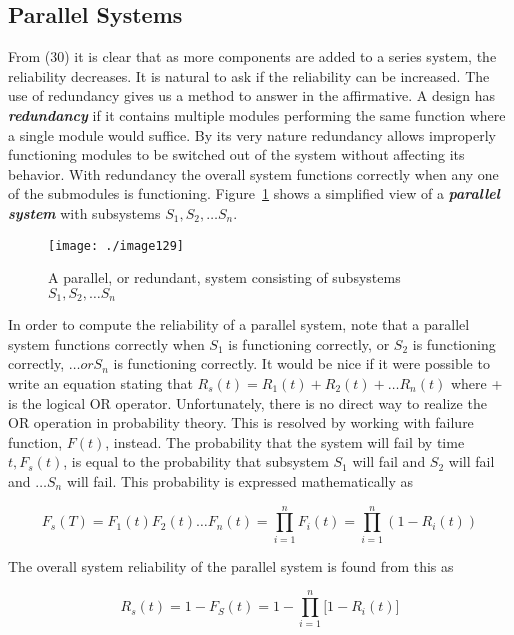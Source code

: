 {\subsection{Parallel Systems}
\label{subsection:parallel-systems}

From (30) it is clear that as more components are added to a series
system, the reliability decreases. It is natural to ask if the
reliability can be increased. The use of redundancy gives us a method to
answer in the affirmative. A design has \emph{\textbf{redundancy}} if it
contains multiple modules performing the same function where a single
module would suffice. By its very nature redundancy allows improperly
functioning modules to be switched out of the system without affecting
its behavior. With redundancy the overall system functions correctly
when any one of the submodules is functioning. 
Figure~\ref{figure:parallelSystem} shows a
simplified view of a \emph{\textbf{parallel system}} with subsystems
$S_1, S_2, \ldots S_n$.

\begin{figure}
\texttt{[image: ./image129]}
\caption{A parallel, or redundant, system consisting of
subsystems $S_1, S_2, \ldots S_n$}
\label{figure:parallelSystem}
\end{figure}

In order to compute the reliability of a parallel system, note that a
parallel system functions correctly when $S_1$ is functioning correctly, or
$S_2$ is functioning correctly, $\ldots or S_n$ is functioning
correctly. It would be nice if it were possible to write an equation
stating that 
$R_s(t) = R_1(t) + R_2(t) + \ldots R_n(t)$ where + is
the logical OR operator. Unfortunately, there is no direct way to
realize the OR operation in probability theory. This is resolved by
working with failure function, $F(t)$, instead. The probability
that the system will fail by time $t, F_s(t)$, is equal to the probability
that subsystem $S_1$ will fail and $S_2$ will fail and $\ldots S_n$
will fail. This probability is expressed mathematically as


\begin{equation}
\label{equ:parallelFailureRate}
F_s(T) = F_1(t)F_2(t) \ldots F_n(t) = \prod_{i=1}^nF_i(t) = \prod_{i=1}^n(1-R_i(t))
\end{equation}


The overall system reliability of the parallel system is found from this
as

\begin{equation}
\label{equ:parallelReliability}
R_s(t) = 1-F_S(t) = 1 - \prod_{i=1}^n \big[ 1-R_i(t) \big]
\end{equation}

}
